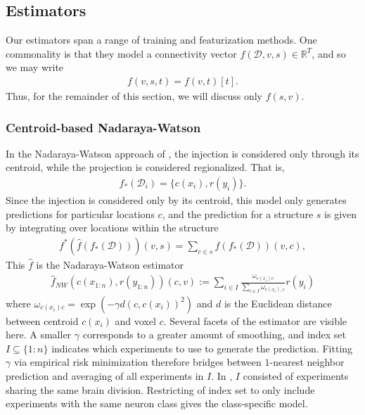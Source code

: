 \newpage
\subsection{Estimators}

Our estimators span a range of training and featurization methods.
One commonality is that they model a connectivity vector $f (\mathcal D, v,s)  \in \mathbb R^T$, and so we may write
\begin{eqnarray*}
f (v,s,t) = f (v,t)[t].
\end{eqnarray*}
Thus, for the remainder of this section, we will discuss only $f (s,v)$.

\subsubsection{Centroid-based Nadaraya-Watson}

In the Nadaraya-Watson approach of \citet{Knox2019-ot}, the injection is considered only through its centroid, while the projection is considered regionalized.
That is,
\begin{eqnarray*}
f_*({\mathcal D}_i) = \{c(x_i) , r(y_i)\}.
\end{eqnarray*}
Since the injection is considered only by its centroid, this model only generates predictions for particular locations $c$, and the prediction for a structure $s$ is given by integrating over locations within the structure
\begin{eqnarray*}
\label{eq:regionalize}
f^* (\hat f (f_*(\mathcal D))) (v,s) = \sum_{c \in s} \hat f (f_*(\mathcal D)) (v,c),
\end{eqnarray*}
This $\hat f$ is the Nadaraya-Watson estimator
\begin{eqnarray*}
\hat f_{NW}( c(x_{1:n}) , r(y_{1:n}) ) (c,v) :=  \sum_{i \in I} \frac{ \omega_{c(x_i) c}}{\sum_{i \in I} \omega_{c(x_i), c}} r(y_i)
\end{eqnarray*}
where $\omega_{c(x_i) c} = \exp( - \gamma d( c , c(x_i))^2 )$ and $d$ is the Euclidean distance between centroid $c(x_i)$ and voxel $c$.
Several facets of the estimator are visible here. %
A smaller $\gamma$ corresponds to a greater amount of smoothing, and index set $I \subseteq  \{1:n\}$ indicates which experiments to use to generate the prediction.
Fitting $\gamma$ via empirical risk minimization therefore bridges between $1$-nearest neighbor prediction and averaging of all experiments in $I$.
In \citet{Knox2019-ot}, $I$ consisted of experiments sharing the same brain division.
 Restricting of index set to only include experiments with the same neuron class gives the class-specific model.

